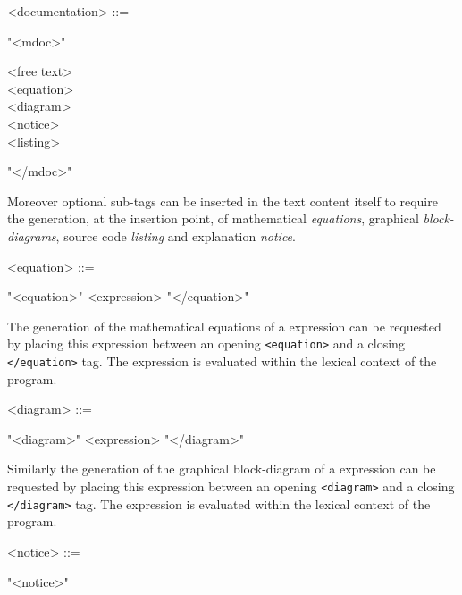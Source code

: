 \documentclass[a4paper]{book}
\begin{document}
\begin{grammar}
  <documentation> ::= 
  \begin{syntdiag}
    "<mdoc>"     
	\begin{stack}
      <free text>\\
      <equation>\\
      <diagram>\\
      <notice>\\
	  <listing>
    \end{stack}
    "</mdoc>"
  \end{syntdiag}
\end{grammar}

Moreover optional sub-tags can be inserted in the text content itself to require the generation, at the insertion point, of mathematical \textit{equations}, graphical \textit{block-diagrams}, \faust source code \textit{listing} and explanation \textit{notice}.

\begin{grammar}
  <equation> ::= 
  \begin{syntdiag}
    "<equation>" <expression> "</equation>"
  \end{syntdiag}
\end{grammar}

The generation of the mathematical equations of a \faust expression can be requested by placing this expression between an opening \lstinline'<equation>' and a closing \lstinline'</equation>' tag. The expression is evaluated within the lexical context of the \faust program.

\begin{grammar}
  <diagram> ::= 
  \begin{syntdiag}
    "<diagram>" <expression> "</diagram>"
  \end{syntdiag}
\end{grammar}

Similarly the generation of the graphical block-diagram of a \faust expression can be requested by placing this expression between an opening \lstinline'<diagram>' and a closing \lstinline'</diagram>' tag. The expression is evaluated within the lexical context of the \faust program.



\begin{grammar}
  <notice> ::= 
  \begin{syntdiag}
    "<notice>"
  \end{syntdiag}
\end{grammar}
\end{document}

